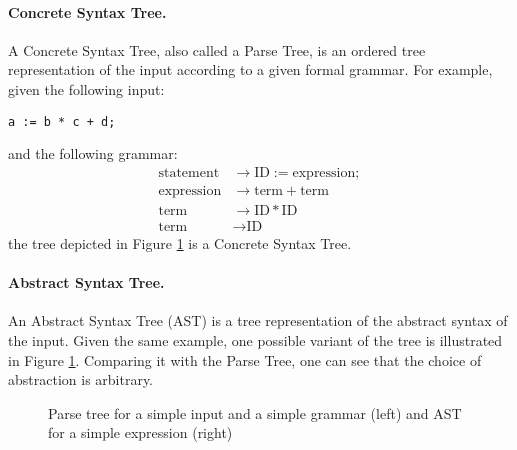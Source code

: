 \paragraph{Concrete Syntax Tree.}
A Concrete Syntax Tree, also called a Parse Tree, is an ordered tree
representation of the input according to a given formal grammar. For example, given the following input:
\begin{lstlisting}
a := b * c + d;
\end{lstlisting}
and the following grammar:
\begin{align*}
  \textrm{statement}  & \rightarrow \textrm{ID} := \textrm{expression} ; \\
  \textrm{expression} & \rightarrow \textrm{term} + \textrm{term} \\
  \textrm{term}       & \rightarrow \textrm{ID} * \textrm{ID} \\
  \textrm{term}       & \rightarrow \textrm{ID}
\end{align*}
the tree depicted in Figure \ref{fig:simple_cst} is a Concrete Syntax Tree.

\paragraph{Abstract Syntax Tree.}
An Abstract Syntax Tree (AST) is a tree representation of the abstract
syntax of the input. Given the same example, one possible variant of the tree is illustrated in Figure
\ref{fig:simple_cst}. Comparing it with the Parse Tree, one can see that the choice of abstraction is
arbitrary.

\begin{figure}[hbt!]
  \centering
  \qquad\qquad\qquad
  \caption{Parse tree for a simple input and a simple grammar (left) and AST for a simple expression (right)}
  \label{fig:simple_cst}
\end{figure}

